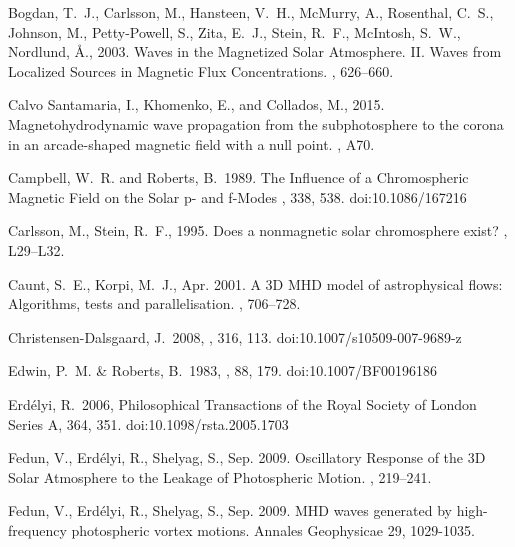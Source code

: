 \documentclass[linenumbers]{aastex63}
\begin{document}
\begin{thebibliography}{}


{Bogdan}, T.~J., {Carlsson}, M., {Hansteen}, V.~H., {McMurry}, A., {Rosenthal},
  C.~S., {Johnson}, M., {Petty-Powell}, S., {Zita}, E.~J., {Stein}, R.~F.,
  {McIntosh}, S.~W., {Nordlund}, {\AA}., 2003. {Waves in the Magnetized Solar
  Atmosphere. II. Waves from Localized Sources in Magnetic Flux
  Concentrations}. , 626--660.

 {Calvo Santamaria}, I., {Khomenko}, E.,  and {Collados}, M., 2015. {Magnetohydrodynamic wave propagation from the subphotosphere to the corona in an arcade-shaped magnetic field with a null point}. , A70.


 {Campbell}, W.~R. and {Roberts}, B.\ 1989. {The Influence of a Chromospheric Magnetic Field on the Solar p- and f-Modes} \apj, 338, 538. doi:10.1086/167216

{Carlsson}, M., {Stein}, R.~F., 1995. {Does a nonmagnetic solar chromosphere
  exist?} , L29--L32.

{Caunt}, S.~E., {Korpi}, M.~J., Apr. 2001. A {3D} {MHD} model of astrophysical
  flows: Algorithms, tests and parallelisation. , 706--728.

 Christensen-Dalsgaard, J.\ 2008, \apss, 316, 113. doi:10.1007/s10509-007-9689-z


 Edwin, P.~M. \& Roberts, B.\ 1983, \solphys, 88, 179. doi:10.1007/BF00196186

 Erd{\'e}lyi, R.\ 2006, Philosophical Transactions of the Royal Society of London Series A, 364, 351. doi:10.1098/rsta.2005.1703

{Fedun}, V., {Erd{\'e}lyi}, R., {Shelyag}, S., Sep. 2009. {Oscillatory Response
  of the 3D Solar Atmosphere to the Leakage of Photospheric Motion}. , 219--241.

{Fedun}, V., {Erd{\'e}lyi}, R., {Shelyag}, S., Sep. 2009. {MHD waves generated by high-frequency photospheric vortex motions}. Annales Geophysicae
  29, 1029-1035.


\end{thebibliography}
\end{document}

